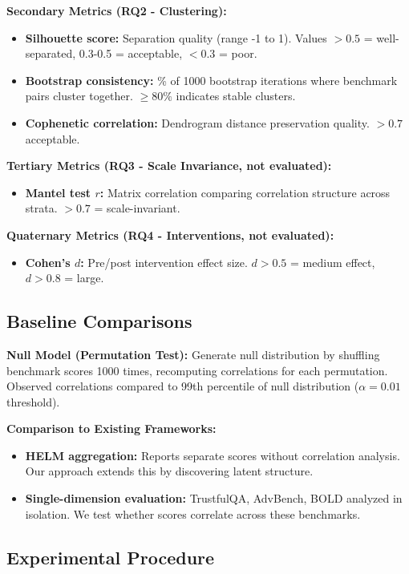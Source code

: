 \textbf{Secondary Metrics (RQ2 - Clustering):}
\begin{itemize}
\item \textbf{Silhouette score:} Separation quality (range -1 to 1). Values $> 0.5$ = well-separated, 0.3-0.5 = acceptable, $< 0.3$ = poor.
\item \textbf{Bootstrap consistency:} \% of 1000 bootstrap iterations where benchmark pairs cluster together. $\geq 80\%$ indicates stable clusters.
\item \textbf{Cophenetic correlation:} Dendrogram distance preservation quality. $> 0.7$ acceptable.
\end{itemize}

\textbf{Tertiary Metrics (RQ3 - Scale Invariance, not evaluated):}
\begin{itemize}
\item \textbf{Mantel test $r$:} Matrix correlation comparing correlation structure across strata. $> 0.7$ = scale-invariant.
\end{itemize}

\textbf{Quaternary Metrics (RQ4 - Interventions, not evaluated):}
\begin{itemize}
\item \textbf{Cohen's $d$:} Pre/post intervention effect size. $d > 0.5$ = medium effect, $d > 0.8$ = large.
\end{itemize}

\subsection{Baseline Comparisons}

\textbf{Null Model (Permutation Test):} Generate null distribution by shuffling benchmark scores 1000 times, recomputing correlations for each permutation. Observed correlations compared to 99th percentile of null distribution ($\alpha = 0.01$ threshold).

\textbf{Comparison to Existing Frameworks:}
\begin{itemize}
\item \textbf{HELM aggregation:} Reports separate scores without correlation analysis. Our approach extends this by discovering latent structure.
\item \textbf{Single-dimension evaluation:} TrustfulQA, AdvBench, BOLD analyzed in isolation. We test whether scores correlate across these benchmarks.
\end{itemize}

\subsection{Experimental Procedure}

